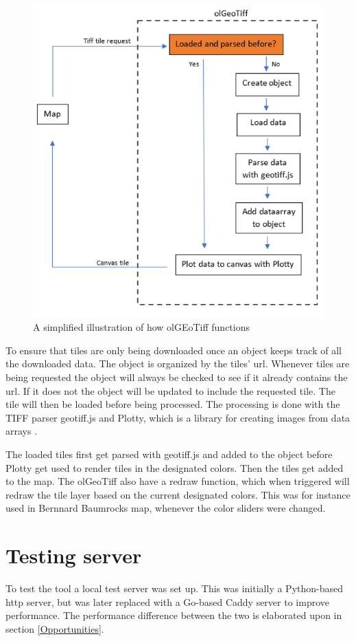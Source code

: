 \begin{figure} [H]
	\centering
	\includegraphics[width=.8\textwidth]{Pictures/olGeoTiffSimplified}
	\caption{A simplified illustration of how olGEoTiff functions}
	\label{olGeoTiffSimplified}
\end{figure}

To ensure that tiles are only being downloaded once an object keeps track of all the downloaded data. The object is organized by the tiles’ url. 
Whenever tiles are being requested the object will always be checked to see if it already contains the url. If it does not the object will be updated to include the requested tile. The tile will then be loaded before being processed. \citep{Baumrocks}
The processing is done with the TIFF parser geotiff.js 
\citep{Geotiff}
and Plotty, which is a library for creating images from data arrays \citep{Plotty}.

The loaded tiles first get parsed with geotiff.js and added to the object before Plotty get used to render tiles in the designated colors. Then the tiles get added to the map.
\citep{Baumrocks}
The olGeoTiff also have a redraw function, which when triggered will redraw the tile layer based on the current designated colors. This was for instance used in Bernnard Baumrocks map, whenever the color sliders were changed. 

\section{Testing server}\label{Caddy}
To test the tool a local test server was set up. This was initially a Python-based http server, but was later replaced with a Go-based Caddy server to improve performance. The performance difference between the two is elaborated upon in section \ref{Opportunities}.

